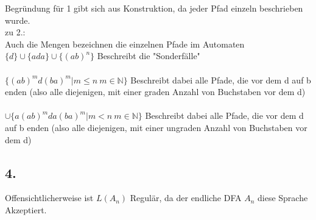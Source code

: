 Begründung für 1 gibt sich aus Konstruktion, da jeder Pfad einzeln beschrieben wurde.\\
zu 2.:\\
Auch die Mengen bezeichnen die einzelnen Pfade im Automaten
$\{d\} \cup \{ada\}\cup \{(ab)^n\}$ Beschreibt die "{}Sonderfälle"{}\\
\\
$ \{(ab)^md(ba)^m|m\leq n\ m\in\mathbb{N}\}$ Beschreibt dabei alle Pfade, die vor dem d auf b enden (also alle diejenigen, mit einer graden Anzahl von Buchstaben vor dem d)\\
\\
$ \cup \{a(ab)^mda(ba)^m|m< n\ m\in\mathbb{N}\}$ Beschreibt dabei alle Pfade, die vor dem d auf b enden (also alle diejenigen, mit einer ungraden Anzahl von Buchstaben vor dem d)\\
\subsection*{4.}
Offensichtlicherweise ist $L(A_n)$ Regulär, da der endliche DFA $A_n$ diese Sprache Akzeptiert.
